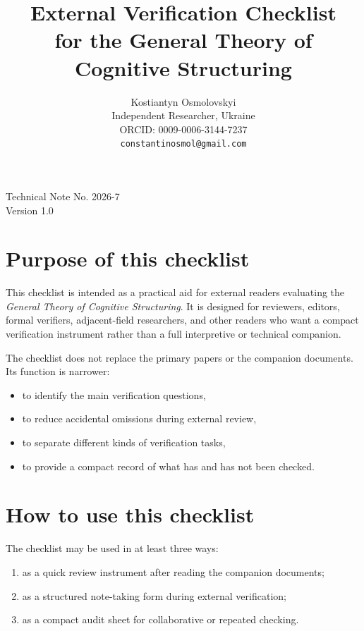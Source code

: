 \documentclass[11pt,a4paper]{article}
\title{External Verification Checklist\\ for the General Theory of Cognitive Structuring}
\author{
	Kostiantyn Osmolovskyi\\
	\small Independent Researcher, Ukraine\\
	\small ORCID: 0009-0006-3144-7237\\
	\small \texttt{constantinosmol@gmail.com}
}
\date{}
\begin{document}
	\maketitle
	
\begin{center}
	\small
	Technical Note No. 2026-7\\
	Version 1.0
\end{center}

\vspace{0.5em}	
	\section{Purpose of this checklist}
	
	This checklist is intended as a practical aid for external readers evaluating the
	\emph{General Theory of Cognitive Structuring}. It is designed for reviewers, editors,
	formal verifiers, adjacent-field researchers, and other readers who want a compact
	verification instrument rather than a full interpretive or technical companion.
	
	The checklist does not replace the primary papers or the companion documents.
	Its function is narrower:
	\begin{itemize}[leftmargin=2em]
		\item to identify the main verification questions,
		\item to reduce accidental omissions during external review,
		\item to separate different kinds of verification tasks,
		\item to provide a compact record of what has and has not been checked.
	\end{itemize}
	
	\section{How to use this checklist}
	
	The checklist may be used in at least three ways:
	\begin{enumerate}[leftmargin=2em]
		\item as a quick review instrument after reading the companion documents;
		\item as a structured note-taking form during external verification;
		\item as a compact audit sheet for collaborative or repeated checking.
	\end{enumerate}
	
\end{document}
